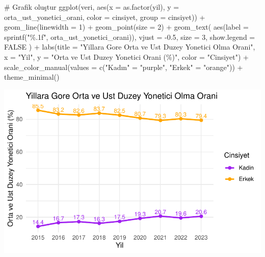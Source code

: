 \documentclass[
  11pt,
  a4paper,
  DIV=11,
  numbers=noendperiod]{scrartcl}
\newenvironment{Shaded}{\begin{snugshade}}{\end{snugshade}}
\newcommand{\AttributeTok}[1]{\textcolor[rgb]{0.40,0.45,0.13}{#1}}
\newcommand{\CommentTok}[1]{\textcolor[rgb]{0.37,0.37,0.37}{#1}}
\newcommand{\ConstantTok}[1]{\textcolor[rgb]{0.56,0.35,0.01}{#1}}
\newcommand{\DecValTok}[1]{\textcolor[rgb]{0.68,0.00,0.00}{#1}}
\newcommand{\FloatTok}[1]{\textcolor[rgb]{0.68,0.00,0.00}{#1}}
\newcommand{\FunctionTok}[1]{\textcolor[rgb]{0.28,0.35,0.67}{#1}}
\newcommand{\NormalTok}[1]{\textcolor[rgb]{0.00,0.23,0.31}{#1}}
\newcommand{\OtherTok}[1]{\textcolor[rgb]{0.00,0.23,0.31}{#1}}
\newcommand{\SpecialCharTok}[1]{\textcolor[rgb]{0.37,0.37,0.37}{#1}}
\newcommand{\StringTok}[1]{\textcolor[rgb]{0.13,0.47,0.30}{#1}}
\begin{document}
\begin{Shaded}
\begin{Highlighting}[]
\CommentTok{\# Grafik oluştur}
\FunctionTok{ggplot}\NormalTok{(veri, }\FunctionTok{aes}\NormalTok{(}\AttributeTok{x =} \FunctionTok{as.factor}\NormalTok{(yil), }\AttributeTok{y =}\NormalTok{ orta\_ust\_yonetici\_orani, }\AttributeTok{color =}\NormalTok{ cinsiyet, }\AttributeTok{group =}\NormalTok{ cinsiyet)) }\SpecialCharTok{+}
  \FunctionTok{geom\_line}\NormalTok{(}\AttributeTok{linewidth =} \DecValTok{1}\NormalTok{) }\SpecialCharTok{+}
  \FunctionTok{geom\_point}\NormalTok{(}\AttributeTok{size =} \DecValTok{2}\NormalTok{) }\SpecialCharTok{+}
  \FunctionTok{geom\_text}\NormalTok{(}
    \FunctionTok{aes}\NormalTok{(}\AttributeTok{label =} \FunctionTok{sprintf}\NormalTok{(}\StringTok{"\%.1f"}\NormalTok{, orta\_ust\_yonetici\_orani)),}
    \AttributeTok{vjust =} \SpecialCharTok{{-}}\FloatTok{0.5}\NormalTok{,}
    \AttributeTok{size =} \DecValTok{3}\NormalTok{,}
    \AttributeTok{show.legend =} \ConstantTok{FALSE}
\NormalTok{  ) }\SpecialCharTok{+}
  \FunctionTok{labs}\NormalTok{(}\AttributeTok{title =} \StringTok{"Yillara Gore Orta ve Ust Duzey Yonetici Olma Orani"}\NormalTok{,}
       \AttributeTok{x =} \StringTok{"Yil"}\NormalTok{,}
       \AttributeTok{y =} \StringTok{"Orta ve Ust Duzey Yonetici Orani (\%)"}\NormalTok{,}
       \AttributeTok{color =} \StringTok{"Cinsiyet"}\NormalTok{) }\SpecialCharTok{+}
  \FunctionTok{scale\_color\_manual}\NormalTok{(}\AttributeTok{values =} \FunctionTok{c}\NormalTok{(}\StringTok{"Kadın"} \OtherTok{=} \StringTok{"purple"}\NormalTok{, }\StringTok{"Erkek"} \OtherTok{=} \StringTok{"orange"}\NormalTok{)) }\SpecialCharTok{+}
  \FunctionTok{theme\_minimal}\NormalTok{()}
\end{Highlighting}
\end{Shaded}

\includegraphics{project_files/figure-pdf/unnamed-chunk-6-1.pdf}
\end{document}
